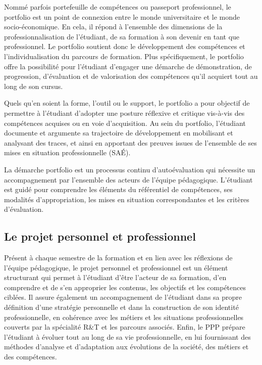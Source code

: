{Nommé parfois portefeuille de compétences ou passeport professionnel, le portfolio est un point de connexion entre le monde universitaire et le monde socio-économique. En cela, il répond à l'ensemble des dimensions de la professionnalisation de l'étudiant, de sa formation à son devenir en tant que professionnel. Le portfolio soutient donc le développement des compétences et l'individualisation du parcours de formation. Plus spécifiquement, le portfolio offre la possibilité pour l'étudiant d'engager une démarche de démonstration, de progression, d'évaluation et de valorisation des compétences qu'il acquiert tout au long de son cursus.

Quels qu'en soient la forme, l'outil ou le support, le portfolio a pour objectif de permettre à l'étudiant d'adopter une posture réflexive et critique vis-à-vis des compétences acquises ou en voie d'acquisition. Au sein du portfolio, l'étudiant documente et argumente sa trajectoire de développement en mobilisant et analysant des traces, et ainsi en apportant des preuves issues de l'ensemble de ses mises en situation professionnelle (SAÉ).

La démarche portfolio est un processus continu d'autoévaluation qui nécessite un accompagnement par l'ensemble des acteurs de l'équipe pédagogique. L'étudiant est guidé pour comprendre les éléments du référentiel de compétences, ses modalités d'appropriation, les mises en situation correspondantes et les critères d'évaluation.


\subsection*{Le projet personnel et professionnel}

Présent à chaque semestre de la formation et en lien avec les réflexions de l'équipe pédagogique, le projet personnel et professionnel est un élément structurant qui permet à l'étudiant d'être l'acteur de sa formation, d'en comprendre et de s'en approprier les contenus, les objectifs et les compétences ciblées. Il assure également un accompagnement de l'étudiant dans sa propre définition d'une stratégie personnelle et dans la construction de son identité professionnelle, en cohérence avec les métiers et les situations professionnelles couverts par la spécialité R\&T et les parcours associés. Enfin, le PPP prépare l'étudiant à évoluer tout au long de sa vie professionnelle, en lui fournissant des méthodes d'analyse et d'adaptation aux évolutions de la société, des métiers et des compétences.

}
